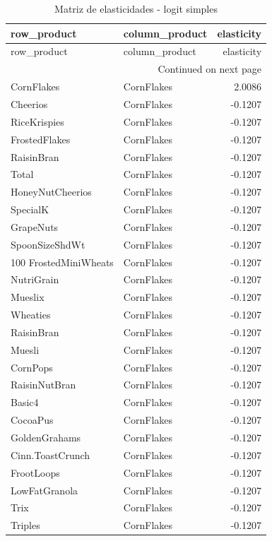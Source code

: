\scriptsize
\begin{longtable}{llr}
\caption{Matriz de elasticidades - logit simples}\label{tab:elas-simple}\\
\toprule
row_product & column_product & elasticity \\
\midrule
\endfirsthead
\toprule
row_product & column_product & elasticity \\
\midrule
\endhead
\midrule
\multicolumn{3}{r}{Continued on next page} \\
\midrule
\endfoot
\bottomrule
\endlastfoot
CornFlakes & CornFlakes & 2.0086 \\
Cheerios & CornFlakes & -0.1207 \\
RiceKrispies & CornFlakes & -0.1207 \\
FrostedFlakes & CornFlakes & -0.1207 \\
RaisinBran & CornFlakes & -0.1207 \\
Total & CornFlakes & -0.1207 \\
HoneyNutCheerios & CornFlakes & -0.1207 \\
SpecialK & CornFlakes & -0.1207 \\
GrapeNuts & CornFlakes & -0.1207 \\
SpoonSizeShdWt & CornFlakes & -0.1207 \\
100%
FrostedMiniWheats & CornFlakes & -0.1207 \\
NutriGrain & CornFlakes & -0.1207 \\
Mueslix & CornFlakes & -0.1207 \\
Wheaties & CornFlakes & -0.1207 \\
RaisinBran & CornFlakes & -0.1207 \\
Muesli & CornFlakes & -0.1207 \\
CornPops & CornFlakes & -0.1207 \\
RaisinNutBran & CornFlakes & -0.1207 \\
Basic4 & CornFlakes & -0.1207 \\
CocoaPus & CornFlakes & -0.1207 \\
GoldenGrahams & CornFlakes & -0.1207 \\
Cinn.ToastCrunch & CornFlakes & -0.1207 \\
FrootLoops & CornFlakes & -0.1207 \\
LowFatGranola & CornFlakes & -0.1207 \\
Trix & CornFlakes & -0.1207 \\
Triples & CornFlakes & -0.1207 \\

\end{longtable}
